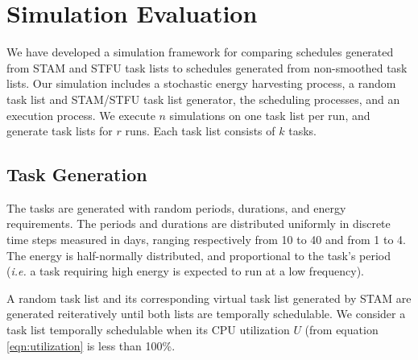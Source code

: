 \section{Simulation Evaluation} \label{sec:simulation}

We have developed a simulation framework for comparing schedules generated from \textsc{STAM} and \textsc{STFU} task lists to schedules generated from non-smoothed task lists.  Our simulation includes a stochastic energy harvesting process, a random task list and \textsc{STAM}/\textsc{STFU} task list generator, the scheduling processes, and an execution process.  We execute $n$ simulations on one task list per run, and generate task lists for $r$ runs.  Each task list consists of $k$ tasks.

\subsection{Task Generation}
The tasks are generated with random periods, durations, and energy requirements.  The periods and durations are distributed uniformly in discrete time steps measured in days, ranging respectively from 10 to 40 and from 1 to 4.  The energy is half-normally distributed, and proportional to the task's period (\emph{i.e.} a task requiring high energy is expected to run at a low frequency).

A random task list and its corresponding virtual task list generated by \textsc{STAM} are generated reiteratively until both lists are temporally schedulable.  We consider a task list temporally schedulable when its CPU utilization $U$ (from equation \ref{eqn:utilization} is less than 100\%.

